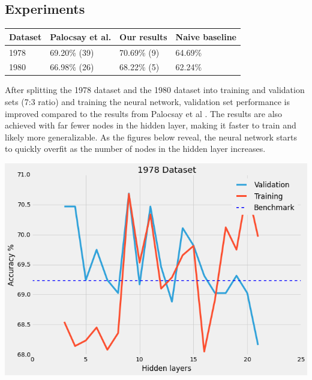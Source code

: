 \documentclass[a4paper]{article}
\theoremstyle{plain}
\begin{document}
\subsection{Experiments}

\begin{center}
\begin{tabular}{l l l l}
\toprule
\textbf{Dataset} & \textbf{Palocsay et al.} & \textbf{Our results} & \textbf{Naive baseline} \\
\midrule
1978 & 69.20\% (39) & 70.69\% (9) & 64.69\% \\
1980 & 66.98\% (26) & 68.22\% (5) & 62.24\% \\
\bottomrule
\end{tabular}
\end{center} 

After splitting the 1978 dataset and the 1980 dataset into training and validation sets (7:3 ratio) and training the neural network, validation set performance is improved compared to the results from Palocsay et al \cite{bib1}. The results are also achieved with far fewer nodes in the hidden layer, making it faster to train and likely more generalizable. As the figures below reveal, the neural network starts to quickly overfit as the number of nodes in the hidden layer increases.

\begin{center}\vspace{1cm}
\includegraphics[width=0.9\linewidth]{1978}
\end{center}\vspace{1cm}
\end{document}
